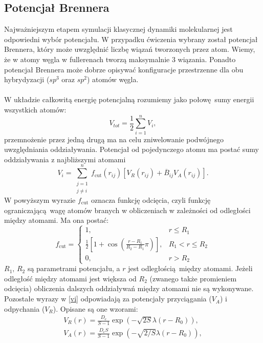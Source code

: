 \documentclass[a4paper,12pt]{article}
\begin{document}
	\subsection*{Potencjał Brennera}
	
	Najważniejszym etapem symulacji klasycznej dynamiki molekularnej jest odpowiedni wybór potencjału.
	W przypadku ćwiczenia wybrany został potencjał Brennera, który może uwzględnić liczbę wiązań tworzonych przez atom.
	Wiemy, że w atomy węgla w fullerenach tworzą maksymalnie 3 wiązania.
	Ponadto potencjał Brennera może dobrze opisywać konfiguracje przestrzenne dla obu hybrydyzacji ($sp^3$ oraz $sp^2$) atomów węgla.
	\\
	\\
	W układzie całkowitą energię potencjalną rozumiemy jako połowę sumy energii wszystkich atomów:
	\begin{equation}
		V_{tot} = \frac{1}{2}\sum_{i=1}^{n} V_i,
	\end{equation}
	przemnożenie przez jedną drugą ma na celu zniwelowanie podwójnego uwzględniania oddziaływania. 
	Potencjał od pojedynczego atomu ma postać sumy oddziaływania z najbliższymi atomami
	\begin{equation}
		V_i = \sum_{\substack{j = 1 \\ j \neq i}}^{n} f_{\text{cut}}(r_{ij})\left[ V_R(r_{ij}) + \overline{B}_{ij}V_A(r_{ij}) \right].
		\label{vi}
	\end{equation}
	W powyższym wyrazie $f_{\text{cut}}$ oznacza funkcję odcięcia, czyli funkcję ograniczającą wagę atomów branych w obliczeniach w zależności od odległości między atomami. Ma ona postać:
	\begin{equation}
		f_{\text{cut}} = 
		\begin{cases}
			1, & r \leq R_1 \\ 
			\frac{1}{2}\left[1 + \cos(\frac{r - R_1}{R_2 - R_1} \pi)\right], & R_1 < r \leq R_2 \\
			0, & r > R_2
		\end{cases}
	\end{equation}
	$R_1, \, R_2$ są parametrami potencjału, a $r$ jest odległością między atomami. Jeżeli odległość między atomami jest większa od $R_2$ (zwanego także promieniem odcięcia) obliczenia dalszych oddziaływań między atomami nie są wykonywane.
	Pozostałe wyrazy w \eqref{vi} odpowiadają za potencjały przyciągania ($V_A$) i odpychania ($V_R$). 
	Opisane są one wzorami:
	\begin{gather}
		V_R(r) = \frac{D_e}{S - 1} \exp(-\sqrt{2S}\lambda\left(r - R_0\right)), \\
		V_A(r) = \frac{D_eS}{S - 1} \exp(-\sqrt{2/S}\lambda\left(r - R_0\right)),
	\end{gather}
\end{document}
